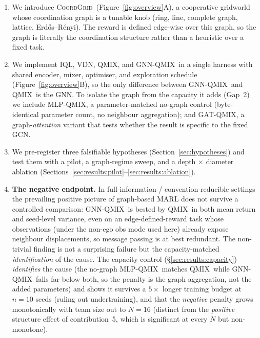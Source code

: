 \documentclass[manuscript, screen, review]{jair}
\newcommand{\algoname}[1]{\textsc{#1}}
\newcommand{\iql}{\algoname{IQL}}
\newcommand{\vdn}{\algoname{VDN}}
\newcommand{\qmix}{\algoname{QMIX}}
\newcommand{\gnnqmix}{\algoname{GNN-QMIX}}
\newcommand{\coordgrid}{\textsc{CoordGrid}}
\newcommand{\mlpqmix}{\algoname{MLP-QMIX}}
\newcommand{\gatqmix}{\algoname{GAT-QMIX}}
\newcommand{\PEseeds}{10}             %
\begin{document}
\begin{enumerate}[leftmargin=*,itemsep=0pt,topsep=2pt]
  \item We introduce \coordgrid\ (Figure~\ref{fig:overview}A), a cooperative
        gridworld whose coordination graph is a tunable knob (ring, line,
        complete graph, lattice, Erd\H{o}s--R\'enyi). The reward is defined
        edge-wise over this graph, so the graph is literally the
        coordination structure rather than a heuristic over a fixed task.
  \item We implement \iql, \vdn, \qmix, and \gnnqmix\ in a single harness
        with shared encoder, mixer, optimiser, and exploration schedule
        (Figure~\ref{fig:overview}B), so the only difference between
        \gnnqmix\ and \qmix\ is the GNN. To isolate the graph from the
        capacity it adds (Gap~2) we include \mlpqmix, a parameter-matched
        no-graph control (byte-identical parameter count, no neighbour
        aggregation); and \gatqmix, a graph-\emph{attention} variant that
        tests whether the result is specific to the fixed GCN.
  \item We pre-register three falsifiable hypotheses
        (Section~\ref{sec:hypotheses}) and test them with a pilot,
        a graph-regime sweep, and a depth $\times$ diameter ablation
        (Sections~\ref{sec:results:pilot}--\ref{sec:results:ablation}).
  \item \textbf{The negative endpoint.} In full-information /
        convention-reducible settings the prevailing positive picture of
        graph-based MARL does not survive a controlled comparison:
        \gnnqmix\ is bested by \qmix\ in both mean return and seed-level
        variance, even on an edge-defined-reward task whose observations
        (under the non-ego obs mode used here) already expose neighbour
        displacements, so message passing is at best redundant. The
        non-trivial finding is not a surprising failure but the
        capacity-matched \emph{identification} of the cause. The capacity control
        (\S\ref{sec:results:capacity}) \emph{identifies} the cause (the
        no-graph \mlpqmix\ matches \qmix\ while \gnnqmix\ falls far below
        both, so the penalty is the graph aggregation, not the added
        parameters) and shows it survives a $5\times$ longer training budget
        at $n{=}\PEseeds$ seeds (ruling out undertraining), and that the
        \emph{negative} penalty grows monotonically with team size out to
        $N{=}16$ (distinct from the \emph{positive} structure effect of
        contribution~5, which is significant at every $N$ but non-monotone).

\end{enumerate}
\end{document}
